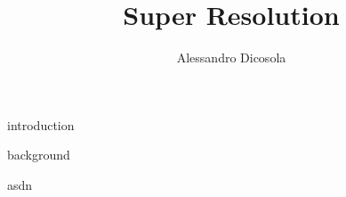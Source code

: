 \documentclass{article}
\author{Alessandro Dicosola}
\title{Super Resolution}
\begin{document}
\maketitle
\tableofcontents

{introduction}

\clearpage
{background}

\clearpage
{asdn}


\clearpage


\end{document}
